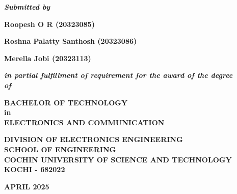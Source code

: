 \documentclass[12pt, a4paper]{report}
\newcommand{\titlefont}{\fontsize{25}{25}\selectfont}
\newcommand{\titlepagefont}{\fontsize{13}{13}\selectfont}
\begin{document}
\linespread{1.2}
\setmainfont{Times New Roman}

\begin{titlepage}
	\titlepagefont
	\centering

	\vspace*{\fill}

	{\titlefont {PYTHON PROJECT REPORT} \par}

	\vspace{1cm}

	{\textit{\textbf{Submitted by}} \par}
	\vspace{.5cm}

	\textbf {Roopesh O R (20323085)} \par
	\textbf {Roshna Palatty Santhosh (20323086)} \par
	\textbf {Merella Jobi (20323113)} \par

	\vspace{1cm}
	{\textit{\textbf{in partial fulfillment of requirement for the award of the degree \\ of }} \par}
	\vspace{.6cm}
	{\textbf{BACHELOR OF TECHNOLOGY \\ in \\ ELECTRONICS AND COMMUNICATION} \par}
	\vspace{1cm}

    

	\vspace{1cm}

	{\textbf{
    DIVISION OF ELECTRONICS ENGINEERING \\
    SCHOOL OF ENGINEERING \\
    COCHIN UNIVERSITY OF SCIENCE AND TECHNOLOGY \\
    KOCHI - 682022
    } \par}

	\vspace{.5cm}

	{\textbf{APRIL 2025} \par}

	\vspace*{\fill}

\end{titlepage}
\end{document}
